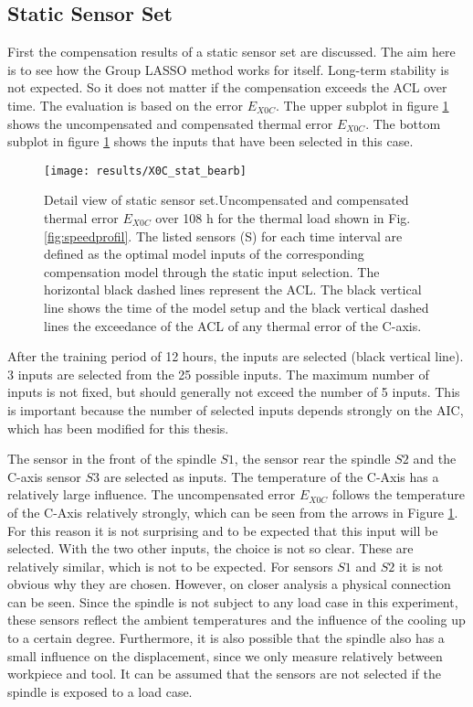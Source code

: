 \subsection{Static Sensor Set}
\label{sec:static_sensor_set}

First the compensation results of a static sensor set are discussed. The aim here is to see how the Group LASSO method works for itself. Long-term stability is not expected. So it does not matter if the compensation exceeds the ACL over time. The evaluation is based on the error $E_{X0C}$. The upper subplot in figure \ref{fig:X0Cstatisch} shows the uncompensated and compensated thermal error $E_{X0C}$. The bottom subplot in figure \ref{fig:X0Cstatisch} shows the inputs that have been selected in this case. 

\begin{figure}[!htb]
    \centering
    \texttt{[image: results/X0C\_stat\_bearb]} %
    \caption[Detail deviation $E_{X0C}$ - static]{Detail view of static sensor set.Uncompensated and compensated thermal
    error $E_{X0C}$ over 108 h for the thermal load shown in Fig. \ref{fig:speedprofil}. The listed sensors (S) for each time interval are defined as the optimal model inputs of the corresponding compensation model through the static input selection. The horizontal black dashed lines represent the ACL. The black vertical line shows the time of the model setup and the black vertical dashed lines the exceedance of the ACL of any thermal error of the C-axis.}
    \label{fig:X0Cstatisch}
\end{figure}

After the training period of 12 hours, the inputs are selected (black vertical line). 3 inputs are selected from the 25 possible inputs. The maximum number of inputs is not fixed, but should generally not exceed the number of 5 inputs. This is important because the number of selected inputs depends strongly on the AIC, which has been modified for this thesis. 

The sensor in the front of the spindle $S1$, the sensor rear the spindle $S2$ and the C-axis sensor $S3$ are selected as inputs. The temperature of the C-Axis has a relatively large influence. The uncompensated error $E_{X0C}$ follows the temperature of the C-Axis relatively strongly, which can be seen from the arrows in Figure \ref{fig:X0Cstatisch}. For this reason it is not surprising and to be expected that this input will be selected. With the two other inputs, the choice is not so clear. These are relatively similar, which is not to be expected. For sensors $S1$ and $S2$ it is not obvious why they are chosen. However, on closer analysis a physical connection can be seen. Since the spindle is not subject to any load case in this experiment, these sensors reflect the ambient temperatures and the influence of the cooling up to a certain degree. Furthermore, it is also possible that the spindle also has a small influence on the displacement, since we only measure relatively between workpiece and tool. It can be assumed that the sensors are not selected if the spindle is exposed to a load case.

